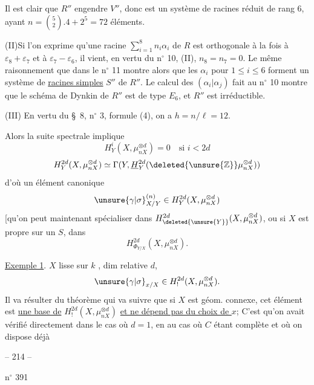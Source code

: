 Il est clair que $R''$ engendre $V''$, donc est un système de racines réduit de
rang 6, ayant $n=\binom52.4+2^5=72$ éléments.

(II)\quad Si l'on exprime qu'une racine $\sum_{i=1}^8n_i\alpha_i$ de $R$ est orthogonale à la fois à
$\varepsilon_8+\varepsilon_7$ et à $\varepsilon_7-\varepsilon_6$, il vient, en vertu du n$^{\circ}$ 10, (II), $n_8=n_7=0$. Le même
raisonnement que dans le n$^{\circ}$ 11 montre alors que les $\alpha_i$ pour $1\leq i\leq6$ forment
un système de \uline{racines simples} $S''$ de $R''$. Le calcul des $(\alpha_i|\alpha_j)$ fait au n$^{\circ}$ 10
montre que le schéma de Dynkin de $R''$ est de type $E_6$, et $R''$ est irréductible.

(III) En vertu du \S\ 8, n$^{\circ}$ 3, formule (4), on a $h=n/\ell=12$.


Alors la suite spectrale implique
\[
H^i_Y(X,\mu_{nX}^{\otimes d})=0\quad\text{si }i<2d
\]
\[
H^{2d}_Y(X,\mu_{nX}^{\otimes d})\simeq
\Gamma(Y,\underline H^{2d}_Y(\deleted{\unsure{\mathbb Z}}\mu_{nX}^{\otimes d}))
\]
d'où un  élément canonique
\[
\unsure{\gamma|\sigma}^{(n)}_{X/Y}\in H^{2d}_Y(X,\mu_{nX}^{\otimes d})
\]
[qu'on peut maintenant spécialiser dans
$H^{2d}_{\deleted{\unsure{Y}}}(X,\mu_{nX}^{\otimes d})$, ou si
$X$ est propre sur un $S$, dans
\[
H^{2d}_{\Phi_{Y/X}}(X,\mu_{nX}^{\otimes d}).
\]

\uline{Exemple 1}. $X$ lisse sur $k$ ,
 dim relative $d$,
\[
\unsure{\gamma|\sigma}_{x/X}\in H^{2d}_!(X,\mu_{nX}^{\otimes d}).
\]
Il va résulter du théorème qui va suivre que 
si $X$ est géom. connexe, cet élément est
\uline{une base de} $H^{2d}_!(X,\mu_{nX}^{\otimes d})$
\uline{et ne dépend pas du choix de $x$};
 C'est qu'on avait vérifié directement dans le cas où
$d=1$, en  
au cas où $C$ étant complète et où on dispose déjà

\begin{center}-- 214 --\end{center}
\hfill n$^\circ$ 391

